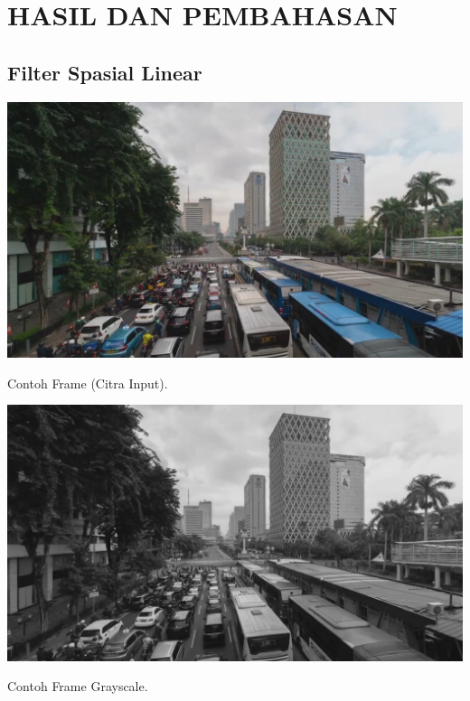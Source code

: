 
\chapter{HASIL DAN PEMBAHASAN}


\section{Filter Spasial Linear}
\blindtext
\begin{afigure}
    \includegraphics[width=\linewidth, center]{images/input-image/input1.png}
    \caption{Contoh Frame (Citra Input).}
    \label{fig:input-image-rgb}
\end{afigure}
\blindtext
\begin{afigure}
    \includegraphics[width=\linewidth, center]{images/output-image/input1-grayscale.png}
    \caption{Contoh Frame Grayscale.}
    \label{fig:input-grayscale}
\end{afigure}

